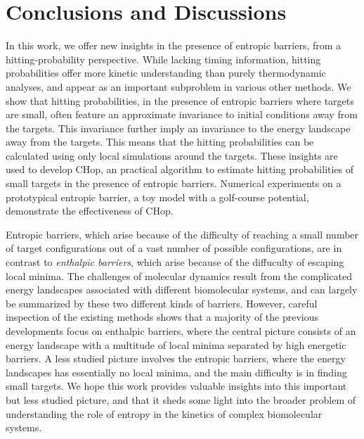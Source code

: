 \documentclass[english, aip, jcp, priprint, graphicx,floatfix]{revtex4-1}
\theoremstyle{plain}
\theoremstyle{definition}
\theoremstyle{plain}
\begin{document}
\section{Conclusions and Discussions}\label{sec:discussion}

In this work, we offer new insights in the presence of entropic barriers, from a hitting-probability perspective. While lacking timing information, hitting probabilities offer more kinetic understanding than purely thermodynamic analyses, and appear as an important subproblem in various other methods. We show that hitting probabilities, in the presence of entropic barriers where targets are small, often feature an approximate invariance to initial conditions away from the targets. This invariance further imply an invariance to the energy landscape away from the targets. This means that the hitting probabilities can be calculated using only local simulations around the targets. These insights are used to develop CHop, an practical algorithm to estimate hitting probabilities of small targets in the presence of entropic barriers. Numerical experiments on a prototypical entropic barrier, a toy model with a golf-course potential, demonstrate the effectiveness of CHop.

Entropic barriers, which arise because of the difficulty of reaching a small number of target configurations out of a vast number of possible configurations, are in contrast to \emph{enthalpic barriers}, which arise because of the diffuculty of escaping local minima. The challenges of molecular dynamics result from the complicated energy landscapes associated with different biomolecular systems, and can largely be summarized by these two different kinds of barriers. However, careful inspection of the existing methods shows that a majority of the previous developments focus on enthalpic barriers, where the central picture consists of an energy landscape with a multitude of local minima separated by high energetic barriers. A less studied picture involves the entropic barriers, where the energy landscapes has essentially no local minima, and the main difficulty is in finding small targets. We hope this work provides valuable insights into this important but less studied picture, and that it sheds some light into the broader problem of understanding the role of entropy in the kinetics of complex biomolecular systems. 
\end{document}
